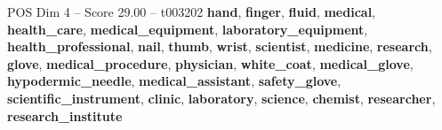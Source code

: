 \begin{textsample}{POS Dim 4 – Score 29.00 – t003202}  \label{ex:f4_pos_020}
\textbf{hand}, \textbf{finger}, \textbf{fluid}, \textbf{medical}, \textbf{health\_care}, \textbf{medical\_equipment}, \textbf{laboratory\_equipment}, \textbf{health\_professional}, \textbf{nail}, \textbf{thumb}, \textbf{wrist}, \textbf{scientist}, \textbf{medicine}, \textbf{research}, \textbf{glove}, \textbf{medical\_procedure}, \textbf{physician}, \textbf{white\_coat}, \textbf{medical\_glove}, \textbf{hypodermic\_needle}, \textbf{medical\_assistant}, \textbf{safety\_glove}, \textbf{scientific\_instrument}, \textbf{clinic}, \textbf{laboratory}, \textbf{science}, \textbf{chemist}, \textbf{researcher}, \textbf{research\_institute}

\end{textsample}
